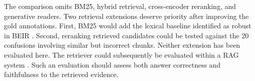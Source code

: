 \documentclass[11pt]{article}
\begin{document}
The comparison omits BM25, hybrid retrieval, cross-encoder reranking, and generative readers. Two retrieval extensions deserve priority after improving the gold annotations. First, BM25 would add the lexical baseline identified as robust in BEIR \citep{thakur2021beir}. Second, reranking retrieved candidates could be tested against the 20 confusions involving similar but incorrect chunks. Neither extension has been evaluated here. The retriever could subsequently be evaluated within a RAG system \citep{lewis2020rag}. Such an evaluation should assess both answer correctness and faithfulness to the retrieved evidence.


\end{document}
